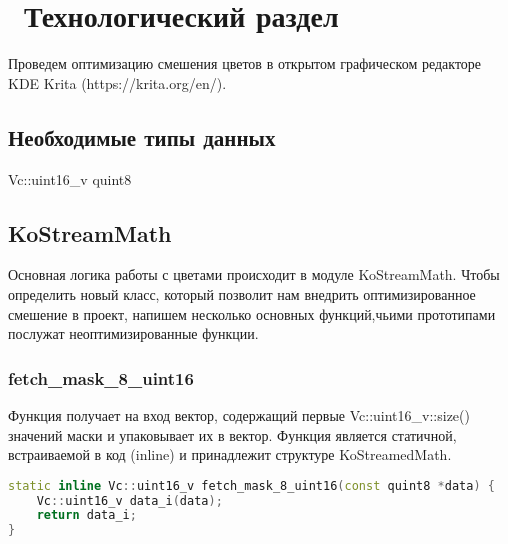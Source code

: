 \chapter{ Технологический раздел}
\label{cha:design}

Проведем оптимизацию смешения цветов в открытом графическом редакторе KDE Krita (https://krita.org/en/). 

\section{Необходимые типы данных}
Vc::uint16\_v
quint8


\section{KoStreamMath}
Основная логика работы с цветами происходит в модуле KoStreamMath. Чтобы определить новый класс, который позволит нам внедрить оптимизированное смешение в проект, напишем несколько основных функций,чьими прототипами послужат неоптимизированные функции.

\subsection{fetch\_mask\_8\_uint16}
Функция получает на вход вектор, содержащий первые Vc::uint16\_v::size() значений маски и упаковывает их в вектор. Функция является статичной, встраиваемой в код (inline) и принадлежит структуре KoStreamedMath.
\begin{lstlisting}[language=c++]
static inline Vc::uint16_v fetch_mask_8_uint16(const quint8 *data) {
    Vc::uint16_v data_i(data);
    return data_i;
}
\end{lstlisting}


